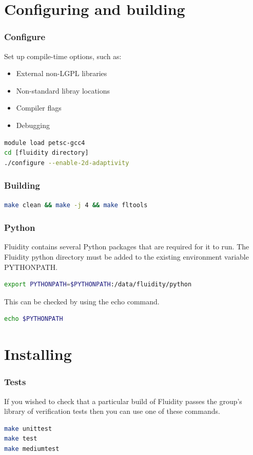 \documentclass[12pt]{beamer}
\begin{document}
\section{Configuring and building}
\begin{frame}[fragile]
        \frametitle{Configure}
Set up compile-time options, such as:
\begin{itemize}
    \item External non-LGPL libraries
    \item Non-standard libray locations
    \item Compiler flags
    \item Debugging
\end{itemize}
\lstset{language=bash}
\begin{lstlisting}[language=bash,basicstyle=\ttfamily]
module load petsc-gcc4
cd [fluidity directory]
./configure --enable-2d-adaptivity
\end{lstlisting}
\end{frame}

\begin{frame}[fragile]
        \frametitle{Building}
\lstset{language=bash}
\begin{lstlisting}[language=bash,basicstyle=\ttfamily]
make clean && make -j 4 && make fltools
\end{lstlisting}
\end{frame}

\begin{frame}[fragile]
    \frametitle{Python}
\lstset{language=bash}
Fluidity contains several Python packages that are required for it to run.  
The Fluidity python directory must be added to the existing environment variable PYTHONPATH.
\begin{lstlisting}[language=bash,basicstyle=\ttfamily\footnotesize]
export PYTHONPATH=$PYTHONPATH:/data/fluidity/python
\end{lstlisting}
This can be checked by using the echo command.
\begin{lstlisting}[language=bash,basicstyle=\ttfamily\footnotesize]
echo $PYTHONPATH
\end{lstlisting}
\end{frame}

\section{Installing}
\begin{frame}[fragile]
        \frametitle{Tests}
\lstset{language=bash}
If you wished to check that a particular build of Fluidity passes the group's library of verification tests then you can use one of these commands.

{}
\begin{lstlisting}[language=bash,basicstyle=\ttfamily]
make unittest
make test
make mediumtest
\end{lstlisting}
\end{frame}
\end{document}
